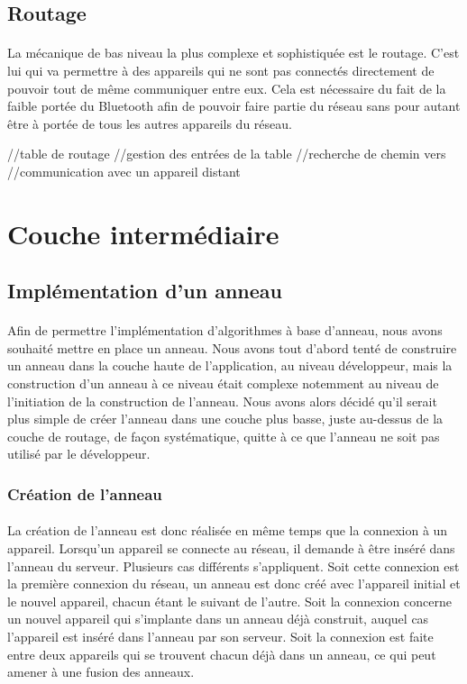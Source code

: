 \documentclass[a4paper,10pt]{report}
\begin{document}
    \subsection{Routage}
    \paragraph{}
    La mécanique de bas niveau la plus complexe et sophistiquée est le routage. C'est lui qui va permettre à des appareils qui ne sont pas connectés directement de pouvoir tout de même communiquer entre eux. Cela est nécessaire du fait de la faible portée du Bluetooth afin de pouvoir faire partie du réseau sans pour autant être à portée de tous les autres appareils du réseau.
    
    //table de routage
    //gestion des entrées de la table
    //recherche de chemin vers
    //communication avec un appareil distant
  
  \section{Couche intermédiaire}
    \subsection{Implémentation d'un anneau}
    \paragraph{}
    Afin de permettre l'implémentation d'algorithmes à base d'anneau, nous avons souhaité mettre en place un anneau. Nous avons tout d'abord tenté de construire un anneau dans la couche haute de l'application, au niveau développeur, mais la construction d'un anneau à ce niveau était complexe notemment au niveau de l'initiation de la construction de l'anneau. Nous avons alors décidé qu'il serait plus simple de créer l'anneau dans une couche plus basse, juste au-dessus de la couche de routage, de façon systématique, quitte à ce que l'anneau ne soit pas utilisé par le développeur.
    
      \subsubsection{Création de l'anneau}
      \paragraph{}
      La création de l'anneau est donc réalisée en même temps que la connexion à un appareil. Lorsqu'un appareil se connecte au réseau, il demande à être inséré dans l'anneau du serveur. Plusieurs cas différents s'appliquent. Soit cette connexion est la première connexion du réseau, un anneau est donc créé avec l'appareil initial et le nouvel appareil, chacun étant le suivant de l'autre. Soit la connexion concerne un nouvel appareil qui s'implante dans un anneau déjà construit, auquel cas l'appareil est inséré dans l'anneau par son serveur. Soit la connexion est faite entre deux appareils qui se trouvent chacun déjà dans un anneau, ce qui peut amener à une fusion des anneaux.
      
\end{document}

